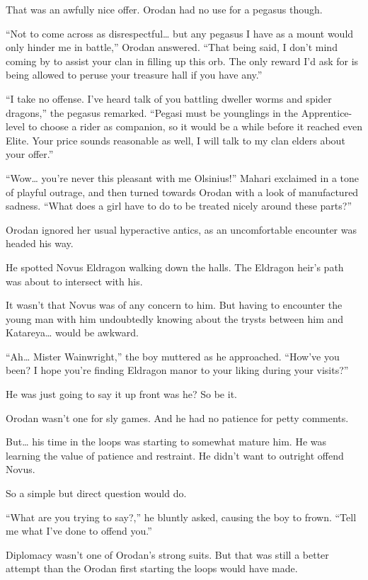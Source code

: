 \documentclass[a4paper,10pt]{book}
\begin{document}
That was an awfully nice offer. Orodan had no use for a pegasus though.\par
“Not to come across as disrespectful… but any pegasus I have as a mount would only hinder me in battle,” Orodan answered. “That being said, I don’t mind coming by to assist your clan in filling up this orb. The only reward I’d ask for is being allowed to peruse your treasure hall if you have any.”\par
“I take no offense. I’ve heard talk of you battling dweller worms and spider dragons,” the pegasus remarked. “Pegasi must be younglings in the Apprentice-level to choose a rider as companion, so it would be a while before it reached even Elite. Your price sounds reasonable as well, I will talk to my clan elders about your offer.”\par
“Wow… you’re never this pleasant with me Olsinius!” Mahari exclaimed in a tone of playful outrage, and then turned towards Orodan with a look of manufactured sadness. “What does a girl have to do to be treated nicely around these parts?”\par
Orodan ignored her usual hyperactive antics, as an uncomfortable encounter was headed his way.\par
He spotted Novus Eldragon walking down the halls. The Eldragon heir’s path was about to intersect with his.\par
It wasn’t that Novus was of any concern to him. But having to encounter the young man with him undoubtedly knowing about the trysts between him and Katareya… would be awkward.\par
“Ah… Mister Wainwright,” the boy muttered as he approached. “How’ve you been? I hope you’re finding Eldragon manor to your liking during your visits?”\par
He was just going to say it up front was he? So be it.\par
Orodan wasn’t one for sly games. And he had no patience for petty comments.\par
But… his time in the loops was starting to somewhat mature him. He was learning the value of patience and restraint. He didn’t want to outright offend Novus.\par
So a simple but direct question would do.\par
“What are you trying to say?,” he bluntly asked, causing the boy to frown. “Tell me what I’ve done to offend you.”\par
Diplomacy wasn’t one of Orodan’s strong suits. But that was still a better attempt than the Orodan first starting the loops would have made.\par
\end{document}
